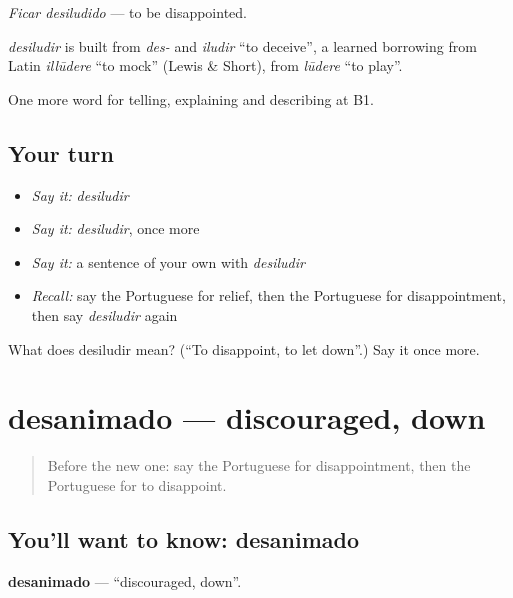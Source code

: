 \emph{Ficar desiludido} — to be disappointed.

\begin{cousinweb}
\emph{desiludir} is built from \emph{des-} and \emph{iludir} \textquotedblleft{}to deceive\textquotedblright{}, a learned borrowing from Latin \emph{illūdere} \textquotedblleft{}to mock\textquotedblright{} (Lewis \& Short), from \emph{lūdere} \textquotedblleft{}to play\textquotedblright{}.
\end{cousinweb}

\begin{grammarlens}[title={What you've built}]
One more word for telling, explaining and describing at B1.
\end{grammarlens}

\subsection*{Your turn}
\begin{itemize}
\raggedright
  \item \emph{Say it:} \emph{desiludir}
  \item \emph{Say it:} \emph{desiludir}, once more
  \item \emph{Say it:} a sentence of your own with \emph{desiludir}
  \item \emph{Recall:} say the Portuguese for relief, then the Portuguese for disappointment, then say \emph{desiludir} again
\end{itemize}

\begin{tcolorbox}[breakable,colback=teal!4,colframe=teal!35!black,title={Before you move on}]
What does desiludir mean? (\textquotedblleft{}To disappoint, to let down\textquotedblright{}.) Say it once more.
\end{tcolorbox}
\section[desanimado]{desanimado — discouraged, down}

\label{lesson:PT-C476-desanimado}



\begin{quote}
Before the new one: say the Portuguese for disappointment, then the Portuguese for to disappoint.
\end{quote}

\subsection*{You'll want to know: desanimado}
\textbf{desanimado} — \textquotedblleft{}discouraged, down\textquotedblright{}.

